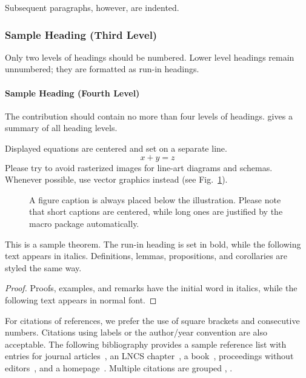 \documentclass[runningheads]{llncs}
\begin{document}
Subsequent paragraphs, however, are indented.

\subsubsection{Sample Heading (Third Level)} Only two levels of
headings should be numbered. Lower level headings remain unnumbered;
they are formatted as run-in headings.

\paragraph{Sample Heading (Fourth Level)}
The contribution should contain no more than four levels of
headings. gives a summary of all heading levels.



\noindent Displayed equations are centered and set on a separate
line.
\begin{equation}
x + y = z
\end{equation}
Please try to avoid rasterized images for line-art diagrams and
schemas. Whenever possible, use vector graphics instead (see
Fig.~\ref{fig1}).

\begin{figure}
\caption{A figure caption is always placed below the illustration.
Please note that short captions are centered, while long ones are
justified by the macro package automatically.} \label{fig1}
\end{figure}

\begin{theorem}
This is a sample theorem. The run-in heading is set in bold, while
the following text appears in italics. Definitions, lemmas,
propositions, and corollaries are styled the same way.
\end{theorem}
%
%
\begin{proof}
Proofs, examples, and remarks have the initial word in italics,
while the following text appears in normal font.
\end{proof}
For citations of references, we prefer the use of square brackets
and consecutive numbers. Citations using labels or the author/year
convention are also acceptable. The following bibliography provides
a sample reference list with entries for journal
articles~\cite{ref_article1}, an LNCS chapter~\cite{ref_lncs1}, a
book~\cite{ref_book1}, proceedings without editors~\cite{ref_proc1},
and a homepage~\cite{ref_url1}. Multiple citations are grouped
\cite{ref_article1,ref_lncs1,ref_book1},
\cite{ref_article1,ref_book1,ref_proc1,ref_url1}.
\end{document}
